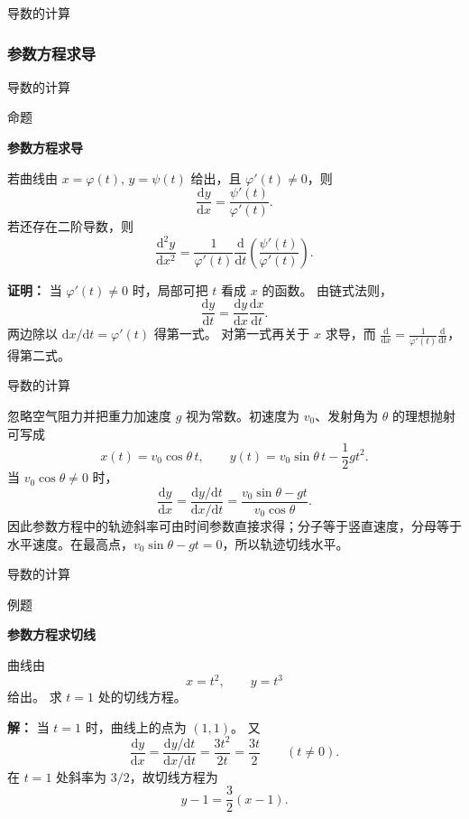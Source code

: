 \documentclass[aspectratio=169,10pt,fontset=fandol]{ctexbeamer}
\newcommand{\dd}{\mathrm{d}}
\begin{document}
\begin{frame}[t,fragile]{导数的计算}
\normalsize
{\normalsize
\subsubsection*{参数方程求导}


}
\end{frame}
\begin{frame}[t,fragile]{导数的计算}
\small
\begin{block}{命题}
{\small
\textbf{参数方程求导}\par

若曲线由 $x=\varphi(t),\,y=\psi(t)$ 给出，且 $\varphi'(t)\neq0$，则
\[
\frac{\dd y}{\dd x}=\frac{\psi'(t)}{\varphi'(t)}.
\]
若还存在二阶导数，则
\[
\frac{\dd^2y}{\dd x^2}
=\frac{1}{\varphi'(t)}\frac{\dd}{\dd t}\left(\frac{\psi'(t)}{\varphi'(t)}\right).
\]

}
\end{block}
\pause
{\small
\textbf{证明：}
当 $\varphi'(t)\neq0$ 时，局部可把 $t$ 看成 $x$ 的函数。 由链式法则，
\[
\frac{\dd y}{\dd t}=\frac{\dd y}{\dd x}\frac{\dd x}{\dd t}.
\]
两边除以 $\dd x/\dd t=\varphi'(t)$ 得第一式。 对第一式再关于 $x$ 求导，而 $\frac{\dd}{\dd x}=\frac1{\varphi'(t)}\frac{\dd}{\dd t}$，得第二式。

}
\end{frame}
\begin{frame}[t,fragile]{导数的计算}
\normalsize
{\normalsize
\begin{application}
忽略空气阻力并把重力加速度 $g$ 视为常数。初速度为 $v_0$、发射角为 $\theta$ 的理想抛射可写成
\[
x(t)=v_0\cos\theta\,t,\qquad
y(t)=v_0\sin\theta\,t-\frac12gt^2.
\]
当 $v_0\cos\theta\neq0$ 时，
\[
\frac{\dd y}{\dd x}
=\frac{\dd y/\dd t}{\dd x/\dd t}
=\frac{v_0\sin\theta-gt}{v_0\cos\theta}.
\]
因此参数方程中的轨迹斜率可由时间参数直接求得；分子等于竖直速度，分母等于水平速度。在最高点，$v_0\sin\theta-gt=0$，所以轨迹切线水平。
\end{application}
}
\end{frame}
\begin{frame}[t,fragile]{导数的计算}
\normalsize
\begin{block}{例题}
{\normalsize
\textbf{参数方程求切线}\par

曲线由
\[
x=t^2,\qquad y=t^3
\]
给出。 求 $t=1$ 处的切线方程。

}
\end{block}
\pause
{\normalsize
\textbf{解：}
当 $t=1$ 时，曲线上的点为 $(1,1)$。 又
\[
\frac{\dd y}{\dd x}
=\frac{\dd y/\dd t}{\dd x/\dd t}
=\frac{3t^2}{2t}
=\frac{3t}{2}\qquad(t\neq0).
\]
在 $t=1$ 处斜率为 $3/2$，故切线方程为
\[
y-1=\frac32(x-1).
\]

}
\end{frame}
\end{document}
